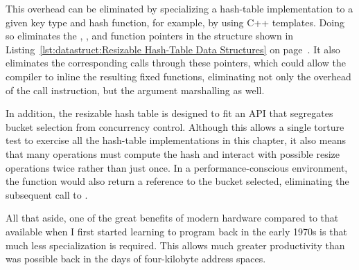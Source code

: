This overhead can be eliminated by specializing a hash-table implementation
to a given key type and hash function, for example, by using C++ templates.
Doing so eliminates the , , and
 function pointers in the  structure shown in
Listing~\ref{lst:datastruct:Resizable Hash-Table Data Structures} on
page~\pageref{lst:datastruct:Resizable Hash-Table Data Structures}.
It also eliminates the corresponding calls through these pointers,
which could allow the compiler to inline the resulting fixed functions,
eliminating not only the overhead of the call instruction, but the
argument marshalling as well.

In addition, the resizable hash table is designed to fit an API
that segregates bucket selection from concurrency control.
Although this allows a single torture test to exercise all the hash-table
implementations in this chapter, it also means that many operations
must compute the hash and interact with possible resize operations twice
rather than just once.
In a performance-conscious environment, the 
function would also return a reference to the bucket selected, eliminating
the subsequent call to .


All that aside, one of the great benefits of modern hardware compared
to that available when I first started learning to program back in
the early 1970s is that much less specialization is required.
This allows much greater productivity than was possible back in the
days of four-kilobyte address spaces.

